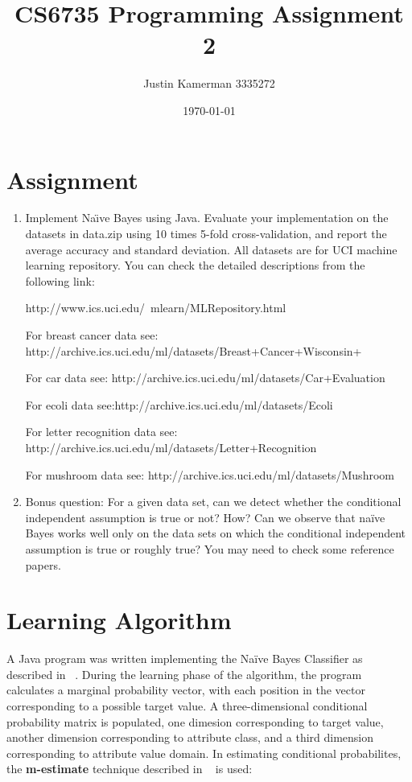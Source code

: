 \documentclass[10pt]{report}
\title{CS6735 Programming Assignment 2}
\author{Justin Kamerman 3335272}
\date{\today}
\begin{document}
\maketitle
\renewcommand*\thesection{\arabic{section}}

\section{Assignment}
\begin{enumerate} 
\item Implement Na\"{\i}ve Bayes using Java. Evaluate your implementation
  on the datasets in data.zip using 10 times 5-fold cross-validation,
  and report the average accuracy and standard deviation. All datasets
  are for UCI machine learning repository. You can check the detailed
  descriptions from the following link: 
 
http://www.ics.uci.edu/~mlearn/MLRepository.html

For breast cancer data see:
http://archive.ics.uci.edu/ml/datasets/Breast+Cancer+Wisconsin+%

For car data see:
http://archive.ics.uci.edu/ml/datasets/Car+Evaluation

For ecoli data see:http://archive.ics.uci.edu/ml/datasets/Ecoli

For letter recognition data see:
http://archive.ics.uci.edu/ml/datasets/Letter+Recognition

For mushroom data see: http://archive.ics.uci.edu/ml/datasets/Mushroom

\item Bonus question: For a given data set, can we detect whether the
  conditional independent assumption is true or not? How? Can we
  observe that naïve Bayes works well only on the data sets on which
  the conditional independent assumption is true or roughly true? You
  may need to check some reference papers. 
\end{enumerate}

\section{Learning Algorithm}
\label{sec:learningalgorithm}

A Java program was written implementing the Na\"{i}ve Bayes Classifier as
described in ~\cite{Mitchell1997}. During the learning phase of the
algorithm, the program calculates a marginal probability vector, with
each position in the vector corresponding to a possible target
value. A three-dimensional conditional probability matrix is
populated, one dimesion corresponding to target value, another
dimension corresponding to attribute class, and a third dimension
corresponding to attribute value domain. In estimating conditional
probabilites, the \textbf{m-estimate} technique described in
~\cite{Mitchell1997} is used:
\end{document}
